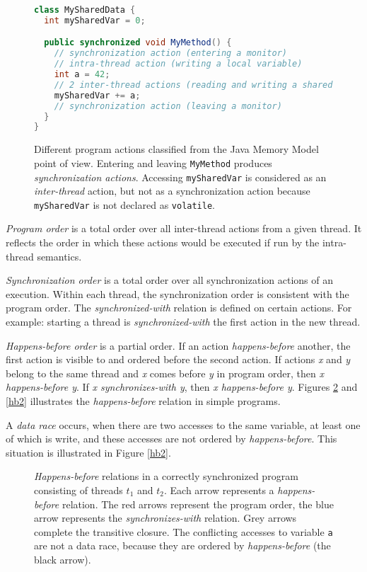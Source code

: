 \begin{figure}[hbt]
    \label{threadActions}
\begin{lstlisting}[language=java]
class MySharedData {
  int mySharedVar = 0;

  public synchronized void MyMethod() {
    // synchronization action (entering a monitor)
    // intra-thread action (writing a local variable)
    int a = 42;
    // 2 inter-thread actions (reading and writing a shared variable)
    mySharedVar += a;
    // synchronization action (leaving a monitor)
  }
}
\end{lstlisting}
    \caption{Different program actions classified from the Java Memory Model
    point of view. Entering and leaving \texttt{MyMethod} produces
    \emph{synchronization actions}. Accessing \texttt{mySharedVar} is considered
    as an \emph{inter-thread} action, but not as a synchronization action
    because \texttt{mySharedVar} is not declared as \texttt{volatile}.}
\end{figure}


\emph{Program order} is a total order over all inter-thread actions from a given
thread. It reflects the order in which these actions would be executed if
run by the intra-thread semantics.

\emph{Synchronization order} is a total order over all synchronization actions
of an execution. Within each thread, the synchronization order is consistent
with the program order. The \emph{synchronized-with} relation is defined on
certain actions. For example: starting a thread is \emph{synchronized-with}
the first action in the new thread.

\emph{Happens-before order} is a partial order. If an action
\emph{happens-before} another, the first action is visible to and ordered before
the second action. If actions \emph{x} and \emph{y} belong to the same thread
and \emph{x} comes before \emph{y} in program order, then \emph{x happens-before
y}.  If \emph{x synchronizes-with y}, then \emph{x happens-before y}. Figures
\ref{hb1} and \ref{hb2} illustrates the \emph{happens-before} relation in simple
programs.

A \emph{data race} occurs, when there are two accesses to the same variable, at
least one of which is write, and these accesses are not ordered by
\emph{happens-before}. This situation is illustrated in Figure \ref{hb2}.

\begin{figure}[hbt]
    \label{hb1}
    
    \caption{\emph{Happens-before} relations in a correctly synchronized program
    consisting of threads $t_1$ and $t_2$. Each arrow represents a
    \emph{happens-before} relation. The red arrows represent the program order,
    the blue arrow represents the \emph{synchronizes-with} relation. Grey arrows
    complete the transitive closure. The conflicting accesses to variable
    \texttt{a} are not a data race, because they are ordered by
    \emph{happens-before} (the black arrow).}
\end{figure}

